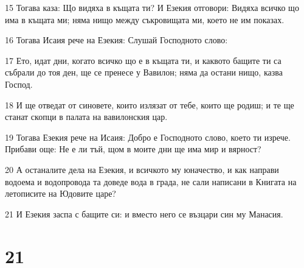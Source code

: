 \par 15 Тогава каза: Що видяха в къщата ти? И Езекия отговори: Видяха всичко що има в къщата ми; няма нищо между съкровищата ми, което не им показах.
\par 16 Тогава Исаия рече на Езекия: Слушай Господното слово:
\par 17 Ето, идат дни, когато всичко що е в къщата ти, и каквото бащите ти са събрали до тоя ден, ще се пренесе у Вавилон; няма да остани нищо, казва Господ.
\par 18 И ще отведат от синовете, които излязат от тебе, които ще родиш; и те ще станат скопци в палата на вавилонския цар.
\par 19 Тогава Езекия рече на Исаия: Добро е Господното слово, което ти изрече. Прибави още: Не е ли тъй, щом в моите дни ще има мир и вярност?
\par 20 А останалите дела на Езекия, и всичкото му юначество, и как направи водоема и водопровода та доведе вода в града, не сали написани в Книгата на летописите на Юдовите царе?
\par 21 И Езекия заспа с бащите си: и вместо него се възцари син му Манасия.

\chapter{21}

